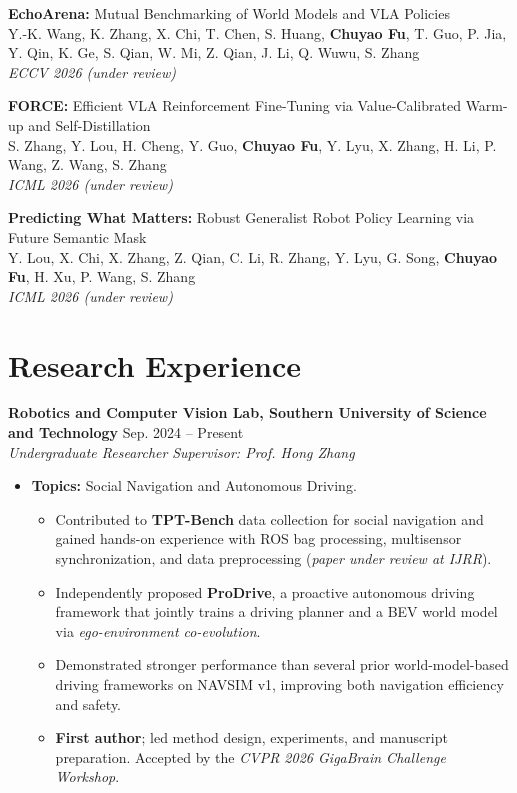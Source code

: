 \documentclass[10pt,a4paper]{article}
\newcommand{\entry}[4]{%
  \textbf{#1} \hfill #2\\
  \textit{#3} \hfill \textit{#4}\\[-0.35em]
}
\newcommand{\cvitem}[1]{\item \small #1}
\begin{document}
\vspace{0.9em}

\noindent
\textbf{EchoArena:} Mutual Benchmarking of World Models and VLA Policies\\
Y.-K. Wang, K. Zhang, X. Chi, T. Chen, S. Huang, \textbf{Chuyao Fu}, T. Guo, P. Jia, Y. Qin, K. Ge, S. Qian, W. Mi, Z. Qian, J. Li, Q. Wuwu, S. Zhang\\
\textit{ECCV 2026 (under review)}

\vspace{0.9em}

\noindent
\textbf{FORCE:} Efficient VLA Reinforcement Fine-Tuning via Value-Calibrated Warm-up and Self-Distillation\\ S. Zhang, Y. Lou, H. Cheng, Y. Guo, \textbf{Chuyao Fu}, Y. Lyu, X. Zhang, H. Li, P. Wang, Z. Wang, S. Zhang\\
\textit{ICML 2026 (under review)}

\vspace{0.9em}

\noindent
\textbf{Predicting What Matters:} Robust Generalist Robot Policy Learning via Future Semantic Mask\\
Y. Lou, X. Chi, X. Zhang, Z. Qian, C. Li, R. Zhang, Y. Lyu, G. Song, \textbf{Chuyao Fu}, H. Xu, P. Wang, S. Zhang\\
\textit{ICML 2026 (under review)}

\section*{Research Experience}

\entry{Robotics and Computer Vision Lab, Southern University of Science and Technology}{Sep. 2024 -- Present}{Undergraduate Researcher}{Supervisor: Prof. Hong Zhang}
\begin{itemize}[leftmargin=1.2em, topsep=0.2em, itemsep=0.18em]
  \cvitem{\textbf{Topics:} Social Navigation and Autonomous Driving.}
  \begin{itemize}[leftmargin=1.4em, topsep=0.15em, itemsep=0.12em]
    \item Contributed to \textbf{TPT-Bench} data collection for social navigation and gained hands-on experience with ROS bag processing, multisensor synchronization, and data preprocessing (\textit{paper under review at IJRR}).
    \item Independently proposed \textbf{ProDrive}, a proactive autonomous driving framework that jointly trains a driving planner and a BEV world model via \emph{ego-environment co-evolution}.
    \item Demonstrated stronger performance than several prior world-model-based driving frameworks on NAVSIM v1, improving both navigation efficiency and safety.
    \item \textbf{First author}; led method design, experiments, and manuscript preparation. Accepted by the \textit{CVPR 2026 GigaBrain Challenge Workshop}.
  \end{itemize}
\end{itemize}
\end{document}
